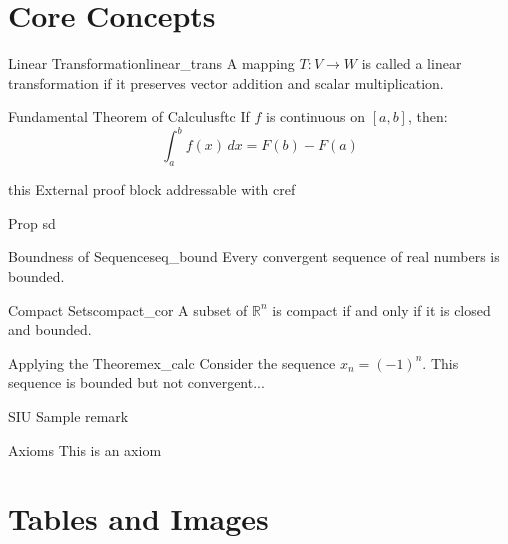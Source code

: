 \documentclass[11pt, a4paper]{article}
\begin{document}
\makefront{}

\tableofcontents
\newpage

\section{Core Concepts}

\begin{definition}{Linear Transformation}{linear_trans}
    A mapping $T: V \to W$ is called a linear transformation if it preserves vector addition and scalar multiplication.
\end{definition}

\begin{theorem}{Fundamental Theorem of Calculus}{ftc}
    If $f$ is continuous on $[a, b]$, then:
    \[
        \int_a^b f(x) \, dx = F(b) - F(a)
    \]
\end{theorem}

\begin{proofblock}{this}
    External proof block addressable with cref
\end{proofblock}

\begin{proposition}{Prop}{}
    sd
\end{proposition}

\begin{lemma}{Boundness of Sequence}{seq_bound}
    Every convergent sequence of real numbers is bounded.
\end{lemma}

\begin{corollary}{Compact Sets}{compact_cor}
    A subset of $\mathbb{R}^n$ is compact if and only if it is closed and bounded.
\end{corollary}

\begin{example}{Applying the Theorem}{ex_calc}
    Consider the sequence $x_n = (-1)^n$. This sequence is bounded but not convergent...
\end{example}

\begin{remark}{SIU}{}
    Sample remark
\end{remark}

\begin{axiom}{Axioms}{}
    This is an axiom
\end{axiom}

\section{Tables and Images}
\end{document}
